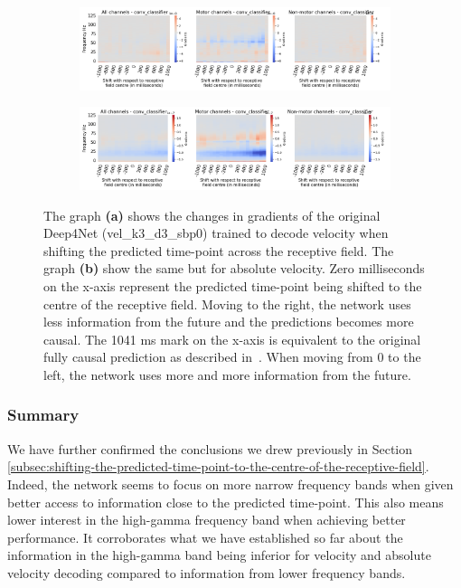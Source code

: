 \begin{figure}[!htbp]
\begin{subfigure}[a]{\textwidth}
   \includegraphics[width=1\linewidth]{img/appendix/C/m/vel/sbp0_m_shift_gradients_conv_classifier_all_kinds}
   \caption{}
   \label{fig:vel-shifting-gradients}
\end{subfigure}

\begin{subfigure}[b]{\textwidth}
   \includegraphics[width=1\linewidth]{img/appendix/C/m/absVel/sbp0_m_shift_gradients_conv_classifier_all_kinds}
   \caption{}
   \label{fig:absVel-shiftig-gradients}
\end{subfigure}
\caption[Gradual shifting - gradients]{The graph \textbf{(a)} shows the changes in gradients of the original Deep4Net (vel\_k3\_d3\_sbp0) trained to decode velocity when shifting the predicted time-point across the receptive field.
The graph \textbf{(b)} show the same but for absolute velocity. Zero milliseconds on the x-axis represent the predicted time-point being shifted to the centre of the receptive field.
Moving to the right, the network uses less information from the future and the predictions becomes more causal.
The 1041 ms mark on the x-axis is equivalent to the original fully causal prediction as described in~\cite{Hammer-2021}.
When moving from 0 to the left, the network uses more and more information from the future.}
\label{fig:shifting-gradients}
\end{figure}

\subsubsection{Summary}\label{subsubsec:across-shiftig-summary}
We have further confirmed the conclusions we drew previously in Section \ref{subsec:shifting-the-predicted-time-point-to-the-centre-of-the-receptive-field}. 
Indeed, the network seems to focus on more narrow frequency bands when given better access to information close to the predicted time-point.
This also means lower interest in the high-gamma frequency band when achieving better performance.
It corroborates what we have established so far about the information in the high-gamma band being inferior for velocity and absolute velocity decoding compared to information from lower frequency bands. 


